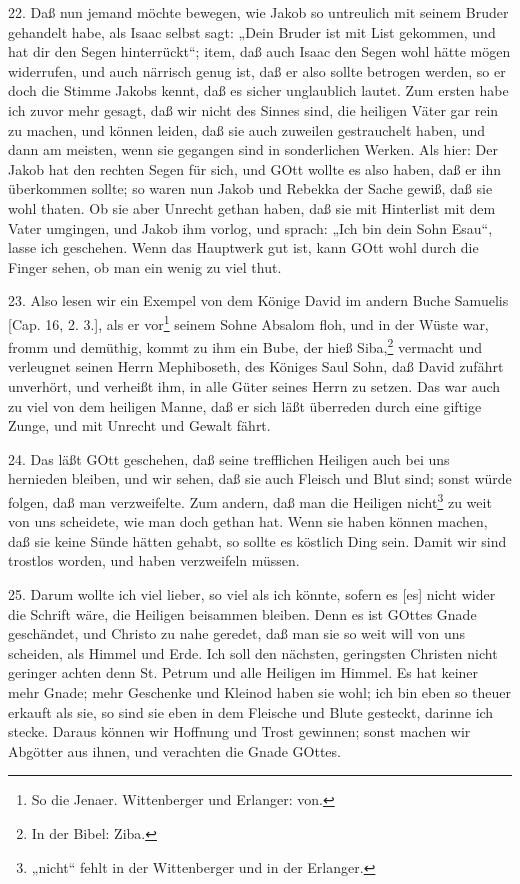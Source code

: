 22. Daß nun jemand möchte bewegen, wie Jakob so untreulich mit seinem Bruder gehandelt habe, als Isaac selbst sagt: „Dein Bruder ist mit List gekommen, und hat dir den Segen hinterrückt“; item, daß auch Isaac den Segen wohl hätte mögen widerrufen, und auch närrisch genug ist, daß er also sollte betrogen werden, so er doch die Stimme Jakobs kennt, daß es sicher unglaublich lautet. Zum ersten habe ich zuvor mehr gesagt, daß wir nicht des Sinnes sind, die heiligen Väter gar rein zu machen, und können leiden, daß sie auch zuweilen gestrauchelt haben, und dann am meisten, wenn sie gegangen sind in sonderlichen Werken. Als hier: Der Jakob hat den rechten Segen für sich, und GOtt wollte es also haben, daß er ihn überkommen sollte; so waren nun Jakob und Rebekka der Sache gewiß, daß sie wohl thaten. Ob sie aber Unrecht gethan haben, daß sie mit Hinterlist mit dem Vater umgingen, und Jakob ihm vorlog, und sprach: „Ich bin dein Sohn Esau“, lasse ich geschehen. Wenn das Hauptwerk gut ist, kann GOtt wohl durch die Finger sehen, ob man ein wenig zu viel thut.

23. Also lesen wir ein Exempel von dem Könige David im andern Buche Samuelis [Cap. 16, 2. 3.], als er vor\footnote{So die Jenaer. Wittenberger und Erlanger: von.} seinem Sohne Absalom floh, und in der Wüste war, fromm und demüthig, kommt zu ihm ein Bube, der hieß Siba,\footnote{In der Bibel: Ziba.} vermacht und verleugnet seinen Herrn Mephiboseth, des Königes Saul Sohn, daß David zufährt unverhört, und verheißt ihm, in alle Güter seines Herrn zu setzen. Das war auch zu viel von dem heiligen Manne, daß er sich läßt überreden durch eine giftige Zunge, und mit Unrecht und Gewalt fährt.

24. Das läßt GOtt geschehen, daß seine trefflichen Heiligen auch bei uns hernieden bleiben, und wir sehen, daß sie auch Fleisch und Blut sind; sonst würde folgen, daß man verzweifelte. Zum andern, daß man die Heiligen nicht\footnote{„nicht“ fehlt in der Wittenberger und in der Erlanger.} zu weit von uns scheidete, wie man doch gethan hat. Wenn sie haben können machen, daß sie keine Sünde hätten gehabt, so sollte es köstlich Ding sein. Damit wir sind trostlos worden, und haben verzweifeln müssen.

25. Darum wollte ich viel lieber, so viel als ich könnte, sofern es [es] nicht wider die Schrift wäre, die Heiligen beisammen bleiben. Denn es ist GOttes Gnade geschändet, und Christo zu nahe geredet, daß man sie so weit will von uns scheiden, als Himmel und Erde. Ich soll den nächsten, geringsten Christen nicht geringer achten denn St. Petrum und alle Heiligen im Himmel. Es hat keiner mehr Gnade; mehr Geschenke und Kleinod haben sie wohl; ich bin eben so theuer erkauft als sie, so sind sie eben in dem Fleische und Blute gesteckt, darinne ich stecke. Daraus können wir Hoffnung und Trost gewinnen; sonst machen wir Abgötter aus ihnen, und verachten die Gnade GOttes.

